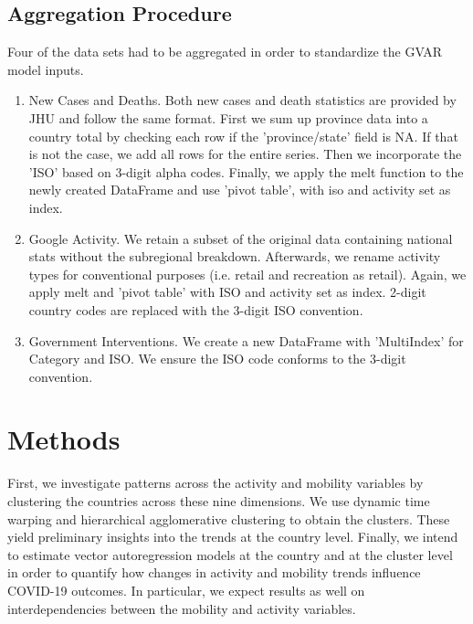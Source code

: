 \documentclass[preprint, 12pt]{elsarticle}
\newcommand{\?}{\stackrel{?}{=}}
\begin{document}
\subsection{Aggregation Procedure}
Four of the data sets had to be aggregated in order to standardize the GVAR model inputs. 
 
  \begin{enumerate}
  \item New Cases and Deaths.
   Both new cases and death statistics are provided by JHU and follow the same format. First we sum up province data into a country total by checking each row if the 'province/state' field is NA.
   If that is not the case, we add all rows for the entire series. Then we incorporate the 'ISO' based on 3-digit alpha codes. Finally, we apply the melt function to the newly created DataFrame
   and use 'pivot table', with iso and activity set as index.
  \item Google Activity.
   We retain a subset of the original data containing national stats without the subregional breakdown. Afterwards, we rename activity types for conventional purposes (i.e. retail and recreation  as retail). Again, we apply melt and 'pivot table' with ISO and activity set as index. 2-digit country codes are replaced with the 3-digit ISO convention.
  \item Government Interventions.
  We create a new DataFrame with 'MultiIndex' for Category and ISO. We ensure the ISO code conforms to the 3-digit convention.
  \end{enumerate}


\section{Methods}
First, we investigate patterns across the activity and mobility variables by clustering the countries across these nine dimensions.
We use dynamic time warping and hierarchical agglomerative clustering to obtain the clusters.
These yield preliminary insights into the trends at the country level.
Finally, we intend to estimate vector autoregression models at the country and at the cluster level in order to quantify how changes in activity and mobility trends influence COVID-19 outcomes. 
In particular, we expect results as well on interdependencies between the mobility and activity variables.
\end{document}
